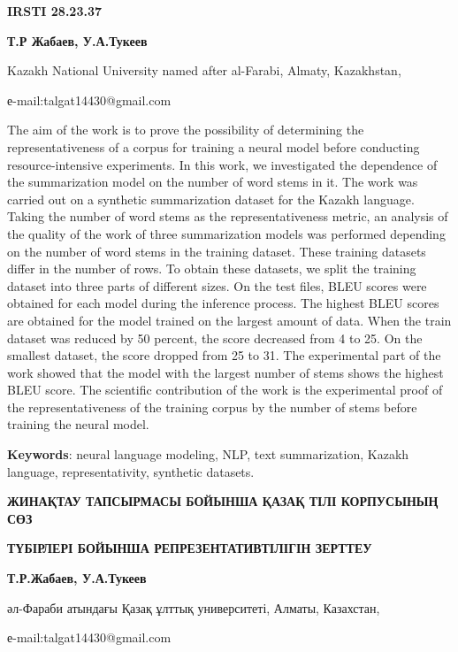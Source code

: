 {\bfseries IRSTI 28.23.37}


\begin{center}
{\bfseries Т.Р Жабаев, У.А.Тукеев}

Kazakh National University named after al-Farabi, Almaty, Kazakhstan,

е-mail:talgat14430@gmail.com
\end{center}

The aim of the work is to prove the possibility of determining the
representativeness of a corpus for training a neural model before
conducting resource-intensive experiments. In this work, we investigated
the dependence of the summarization model on the number of word stems in
it. The work was carried out on a synthetic summarization dataset for
the Kazakh language. Taking the number of word stems as the
representativeness metric, an analysis of the quality of the work of
three summarization models was performed depending on the number of word
stems in the training dataset. These training datasets differ in the
number of rows. To obtain these datasets, we split the training dataset
into three parts of different sizes. On the test files, BLEU scores were
obtained for each model during the inference process. The highest BLEU
scores are obtained for the model trained on the largest amount of data.
When the train dataset was reduced by 50 percent, the score decreased
from 4 to 25. On the smallest dataset, the score dropped from 25 to 31.
The experimental part of the work showed that the model with the largest
number of stems shows the highest BLEU score. The scientific
contribution of the work is the experimental proof of the
representativeness of the training corpus by the number of stems before
training the neural model.

{\bfseries Keywords}: neural language modeling, NLP, text summarization,
Kazakh language, representativity, synthetic datasets.

\begin{center}
{\large\bfseries ЖИНАҚТАУ ТАПСЫРМАСЫ БОЙЫНША ҚАЗАҚ ТІЛІ КОРПУСЫНЫҢ СӨЗ}

{\bfseries ТҮБІРЛЕРІ БОЙЫНША РЕПРЕЗЕНТАТИВТІЛІГІН ЗЕРТТЕУ}

{\bfseries Т.Р.Жабаев, У.А.Тукеев}

әл-Фараби атындағы Қазақ ұлттық университеті, Алматы, Казахстан,

е-mail:talgat14430@gmail.com
\end{center}

